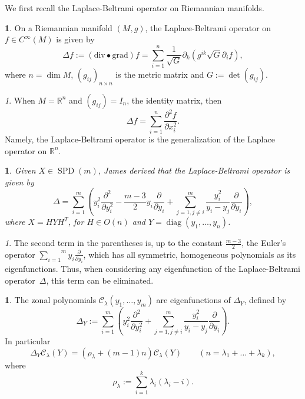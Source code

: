 \documentclass[10pt,oneside,american]{amsart}
\numberwithin{equation}{section}
\numberwithin{figure}{section}
\theoremstyle{plain}
\theoremstyle{definition}
\newtheorem{defn}[thm]{\protect\definitionname}
\theoremstyle{remark}
\newtheorem{rem}[thm]{\protect\remarkname}
\theoremstyle{plain}
\newtheorem{prop}[thm]{\protect\propositionname}
\theoremstyle{definition}
\theoremstyle{plain}
\theoremstyle{plain}
\DeclareMathOperator{\diag}{diag}
\newcommand{\SPD}{\operatorname{SPD}}
\providecommand{\definitionname}{Definition}
\providecommand{\propositionname}{Proposition}
\providecommand{\remarkname}{Remark}
\begin{document}
We first recall the Laplace-Beltrami operator on Riemannian manifolds.
\begin{defn}
On a Riemannian manifold $\left(M,g\right)$, the Laplace-Beltrami
operator on $f\in C^{\infty}(M)$ is given by 
\[
\Delta f:=\left(\mathrm{div}\bullet\mathrm{grad}\right)f=\sum_{i=1}^{n}\frac{1}{\sqrt{G}}\partial_{k}\left(g^{ik}\sqrt{G}\partial_{i}f\right),
\]
where $n=\dim M$, $\left(g_{ij}\right)_{n\times n}$ is the metric
matrix and $G:=\det\left(g_{ij}\right)$. 
\end{defn}
\begin{rem}
When $M=\mathbb{R}^{n}$ and $\left(g_{ij}\right)=I_{n}$, the identity
matrix, then 
\[
\Delta f=\sum_{i=1}^{n}\frac{\partial^{2}f}{\partial x_{i}^{2}}.
\]
Namely, the Laplace-Beltrami operator is the generalization of the Laplace
operator on $\mathbb{R}^{n}$. 
\end{rem}
\begin{prop}
Given $X\in \SPD(m)$, James \cite[eq.~3.12, pp.~1712]{James1} derived
that the Laplace-Beltrami operator is given by
\[
\Delta=\sum_{i=1}^{m}\left(y_{i}^{2}\frac{\partial^{2}}{\partial y_{i}^{2}}-\frac{m-3}{2}y_{i}\frac{\partial}{\partial y_{i}}+\sum_{j=1,j\neq i}^{m}\frac{y_{i}^{2}}{y_{i}-y_{j}}\frac{\partial}{\partial y_{i}}\right),
\]
where $X=HYH^{T}$, for $H\in O(n)$ and $Y=\diag(y_{1},\ldots,y_{n})$. 
\end{prop}
\begin{rem}
The second term in the parentheses is, up to the constant $\frac{m-3}{2}$,
the Euler's operator $\overset{m}{\underset{i=1}{\sum}}y_{i}\frac{\partial}{\partial y_{i}}$,
which has all symmetric, homogeneous polynomials as its eigenfunctions.
Thus, when considering any eigenfunction of the Laplace-Beltrami operator~$\Delta$,
this term can be eliminated.
\end{rem}
\begin{defn}
The zonal polynomials $\mathcal{C}_{\lambda}(y_{1},\ldots,y_{m})$
are eigenfunctions of $\Delta_{Y}$, defined by
\[
  \Delta_{Y}:=\sum_{i=1}^{m}\left(y_{i}^{2}\frac{\partial^{2}}{\partial y_{i}^{2}}+\sum_{j=1,j\neq i}^{m}\frac{y_{i}^{2}}{y_{i}-y_{j}}\frac{\partial}{\partial y_{i}}\right).
\]
In particular
\[
  \Delta_{Y}\mathcal{C}_{\lambda}(Y)=\left(\rho_{\lambda}+(m-1)n\right)\mathcal{C}_{\lambda}(Y)
  \qquad (n=\lambda_1+\dots+\lambda_k),
\]
where
\begin{equation}
  \rho_{\lambda}:=\sum_{i=1}^{k}\lambda_{i}\left(\lambda_{i}-i\right).\label{eq:RHO}
\end{equation}
\end{defn}
\end{document}
